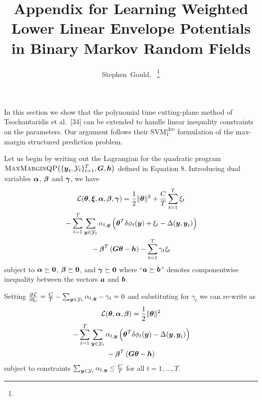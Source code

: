 \documentclass[10pt,journal,letterpaper,compsoc]{IEEEtran}
\newcommand{\mmqp}[3]{\textrm{\sc MaxMarginQP}\!\left(\{\by_t, #1\}_{t=1}^{T}, #2, #3\right)}
\numberwithin{equation}{section}
\begin{document}
\title{Appendix for Learning Weighted Lower Linear Envelope Potentials
  in Binary Markov Random Fields}

\author{Stephen~Gould,~%
%
\thanks{}}

\appendix

In this section we show that the polynomial time cutting-plane method
of Tsochantaridis et al.~[34] can be extended to handle linear
inequality constraints on the parameters. Our argument follows their
$\text{SVM}_1^{\Delta m}$ formulation of the max-margin structured
prediction problem.

Let us begin by writing out the Lagrangian for the quadratic program
$\mmqp{\Y_t}{\bG}{\bh}$  defined in Equation 8.
Introducing dual variables $\boldsymbol{\alpha}$, $\boldsymbol{\beta}$ and $\boldsymbol{\gamma}$, we have
%
\begin{multline}
  \Ell(\btheta, \bxi, \balpha, \bbeta, \bgamma) =
  \frac{1}{2} \|\btheta\|^2 + \frac{C}{T} \sum_{t=1}^{T} \xi_t\\
  {}- \sum_{t=1}^{T} \sum_{\by \in \Y_t} \alpha_{t, \by} \left(\btheta^T \delta\phi_t(\by) + \xi_t - \Delta(\by, \by_t)\right)\\
  {}- \bbeta^T \left( \bG \btheta - \bh\right) - \sum_{t=1}^T \gamma_t \xi_t
  \label{eqn:lagrangian}
\end{multline}
%
subject to $\boldsymbol{\alpha} \succeq \textbf{0}$, $\boldsymbol{\beta} \succeq \textbf{0}$, and
$\boldsymbol{\gamma} \succeq \textbf{0}$ where ``$\boldsymbol{a} \succeq \boldsymbol{b}$'' denotes
componentwise inequality between the vectors $\boldsymbol{a}$ and $\boldsymbol{b}$.

Setting $\frac{\partial \Ell}{\partial \xi_i} = \frac{C}{T} -
\sum_{\by \in \Y_t} \alpha_{t,\by} - \gamma_t = 0$ and substituting
for $\gamma_t$ we can re-write  as
%
\begin{multline}
  \Ell(\btheta, \balpha, \bbeta) =
  \frac{1}{2} \|\btheta\|^2 \\
  {}- \sum_{t=1}^{T} \sum_{\by \in \Y_t} \alpha_{t, \by} \left(\btheta^T \delta\phi_t(\by) - \Delta(\by, \by_t)\right)\\
  {}- \bbeta^T \left( \bG \btheta - \bh\right)
  \label{eqn:lagrangian2}
\end{multline}
%
subject to constraints $\sum_{\by \in \Y_t} \alpha_{t,\by} \leq
\frac{C}{T}$ for all $t = 1, \ldots, T$.
\end{document}
